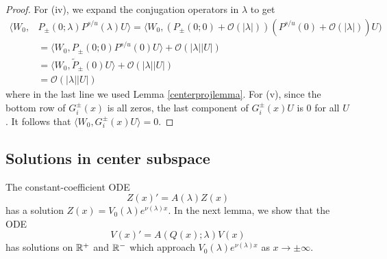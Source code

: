 \documentclass[thesis.tex]{subfiles}
\begin{document}
\begin{lemma}
\begin{proof}
For (iv), we expand the conjugation operators in $\lambda$ to get
\begin{align*}
\langle W_0, &P_\pm(0; \lambda)P^{s/u}(\lambda) U \rangle =
\langle W_0, (P_\pm(0; 0) + \mathcal{O}(|\lambda|))(P^{s/u}(0) + \mathcal{O}(|\lambda|)) U) \\
&= \langle W_0, P_\pm(0; 0) P^{s/u}(0)U \rangle + \mathcal{O}(|\lambda||U|) \\
&= \langle W_0, \tilde{P}_\pm(0) U \rangle + \mathcal{O}(|\lambda||U|) \\
&= \mathcal{O}(|\lambda||U|) 
\end{align*}
where in the last line we used Lemma \ref{centerprojlemma}. For (v), since the bottom row of $G_i^\pm(x)$ is all zeros, the last component of $G_i^\pm(x) U$ is 0 for all $U$. It follows that $\langle W_0, G_i^\pm(x) U\rangle = 0$. 
\end{proof}
\end{lemma}

\subsection{Solutions in center subspace}

The constant-coefficient ODE
\[
Z(x)' = A(\lambda)Z(x)
\]
has a solution $Z(x) = V_0(\lambda)e^{\nu(\lambda)x}$. In the next lemma, we show that the ODE
\[
V(x)' = A(Q(x); \lambda)V(x)
\]
has solutions on $\mathbb{R}^+$ and $\mathbb{R}^-$ which approach $V_0(\lambda)e^{\nu(\lambda)x}$ as $x \rightarrow \pm \infty$.
\end{document}
